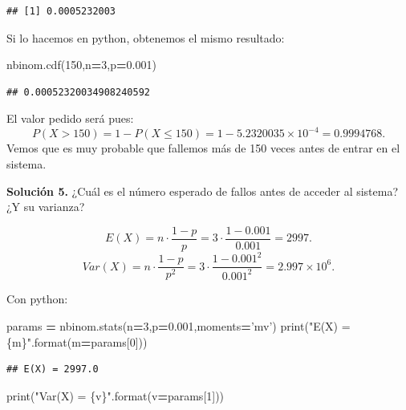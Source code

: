 \documentclass[]{book}
\newenvironment{Shaded}{\begin{snugshade}}{\end{snugshade}}
\newcommand{\BuiltInTok}[1]{#1}
\newcommand{\DecValTok}[1]{\textcolor[rgb]{0.00,0.00,0.81}{#1}}
\newcommand{\FloatTok}[1]{\textcolor[rgb]{0.00,0.00,0.81}{#1}}
\newcommand{\NormalTok}[1]{#1}
\newcommand{\OperatorTok}[1]{\textcolor[rgb]{0.81,0.36,0.00}{\textbf{#1}}}
\newcommand{\SpecialCharTok}[1]{\textcolor[rgb]{0.00,0.00,0.00}{#1}}
\newcommand{\StringTok}[1]{\textcolor[rgb]{0.31,0.60,0.02}{#1}}
\begin{document}
\begin{verbatim}
## [1] 0.0005232003
\end{verbatim}

Si lo hacemos en python, obtenemos el mismo resultado:

\begin{Shaded}
\begin{Highlighting}[]
\NormalTok{nbinom.cdf(}\DecValTok{150}\NormalTok{,n}\OperatorTok{=}\DecValTok{3}\NormalTok{,p}\OperatorTok{=}\FloatTok{0.001}\NormalTok{)}
\end{Highlighting}
\end{Shaded}

\begin{verbatim}
## 0.00052320034908240592
\end{verbatim}

El valor pedido será pues:
\[
P(X>150)=1-P(X\leq 150)=1-\ensuremath{5.2320035\times 10^{-4}}=0.9994768.
\]
Vemos que es muy probable que fallemos más de 150 veces antes de entrar en el sistema.

\textbf{Solución 5.} ¿Cuál es el número esperado de fallos antes de acceder al sistema? ¿Y su varianza?

\[E(X)=n\cdot \frac{1-p}{p}=3\cdot \frac{1- 0.001}{0.001}=2997.\]
\[Var(X)=n\cdot \frac{1-p}{p^2}=3\cdot \frac{1- 0.001^2}{0.001^2}=\ensuremath{2.997\times 10^{6}}.\]

Con python:

\begin{Shaded}
\begin{Highlighting}[]
\NormalTok{params }\OperatorTok{=}\NormalTok{ nbinom.stats(n}\OperatorTok{=}\DecValTok{3}\NormalTok{,p}\OperatorTok{=}\FloatTok{0.001}\NormalTok{,moments}\OperatorTok{=}\StringTok{'mv'}\NormalTok{)}
\BuiltInTok{print}\NormalTok{(}\StringTok{"E(X) = }\SpecialCharTok{\{m\}}\StringTok{"}\NormalTok{.}\BuiltInTok{format}\NormalTok{(m}\OperatorTok{=}\NormalTok{params[}\DecValTok{0}\NormalTok{]))}
\end{Highlighting}
\end{Shaded}

\begin{verbatim}
## E(X) = 2997.0
\end{verbatim}

\begin{Shaded}
\begin{Highlighting}[]
\BuiltInTok{print}\NormalTok{(}\StringTok{"Var(X) = }\SpecialCharTok{\{v\}}\StringTok{"}\NormalTok{.}\BuiltInTok{format}\NormalTok{(v}\OperatorTok{=}\NormalTok{params[}\DecValTok{1}\NormalTok{]))}
\end{Highlighting}
\end{Shaded}
\end{document}

